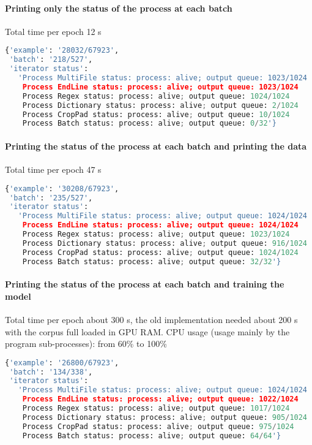 \paragraph{Printing only the status of the process at each
batch}

Total time per epoch 12 s

\begin{lstlisting}[language=Python]
{'example': '28032/67923',
 'batch': '218/527',
 'iterator status':
   'Process MultiFile status: process: alive; output queue: 1023/1024
    Process EndLine status: process: alive; output queue: 1023/1024
    Process Regex status: process: alive; output queue: 1024/1024
    Process Dictionary status: process: alive; output queue: 2/1024
    Process CropPad status: process: alive; output queue: 10/1024
    Process Batch status: process: alive; output queue: 0/32'}
\end{lstlisting}

\newpage
\paragraph{Printing the status of the process at each batch and printing
the
data}

Total time per epoch 47 s

\begin{lstlisting}[language=Python]
{'example': '30208/67923',
 'batch': '235/527',
 'iterator status': 
   'Process MultiFile status: process: alive; output queue: 1024/1024
    Process EndLine status: process: alive; output queue: 1024/1024
    Process Regex status: process: alive; output queue: 1023/1024
    Process Dictionary status: process: alive; output queue: 916/1024
    Process CropPad status: process: alive; output queue: 1024/1024
    Process Batch status: process: alive; output queue: 32/32'}
\end{lstlisting}

\paragraph{Printing the status of the process at each batch and training
the
model}

Total time per epoch about 300 s, the old implementation needed about
200 s with the corpus full loaded in GPU RAM. CPU usage (usage mainly by
the program sub-processes): from 60\% to 100\%

\begin{lstlisting}[language=Python]
{'example': '26800/67923',
 'batch': '134/338',
 'iterator status':
   'Process MultiFile status: process: alive; output queue: 1024/1024
    Process EndLine status: process: alive; output queue: 1022/1024
    Process Regex status: process: alive; output queue: 1017/1024
    Process Dictionary status: process: alive; output queue: 905/1024
    Process CropPad status: process: alive; output queue: 975/1024
    Process Batch status: process: alive; output queue: 64/64'}
\end{lstlisting}

